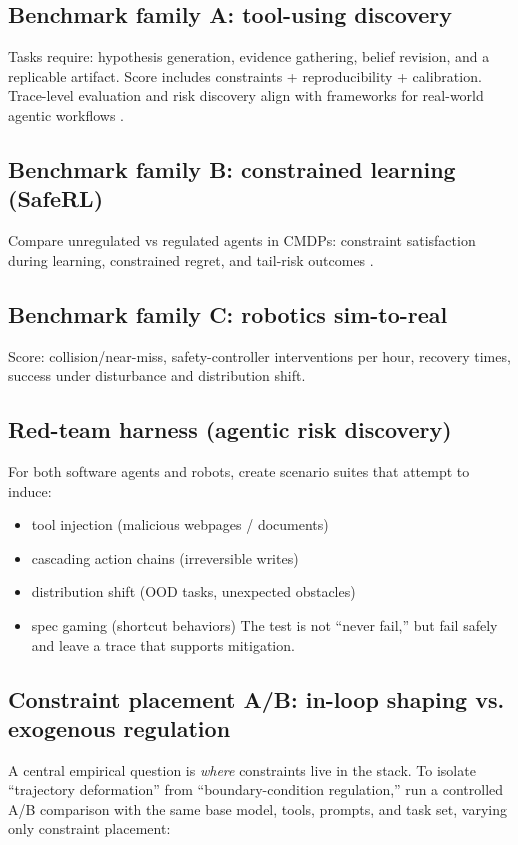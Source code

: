 \documentclass[11pt]{article}
\begin{document}
\subsection{Benchmark family A: tool-using discovery}
Tasks require: hypothesis generation, evidence gathering, belief revision, and a replicable artifact.
Score includes constraints + reproducibility + calibration. Trace-level evaluation and risk discovery
align with frameworks for real-world agentic workflows \citep{ghosh2025agentic}.
\subsection{Benchmark family B: constrained learning (SafeRL)}
Compare unregulated vs regulated agents in CMDPs: constraint satisfaction during learning,
constrained regret, and tail-risk outcomes \citep{kushwaha2025saferl_cmdp_survey,ni2025safe_exploration_cmdp}.
\subsection{Benchmark family C: robotics sim-to-real}
Score: collision/near-miss, safety-controller interventions per hour, recovery times, success under
disturbance and distribution shift.
\subsection{Red-team harness (agentic risk discovery)}
For both software agents and robots, create scenario suites that attempt to induce:
\begin{itemize}
\item 
tool injection (malicious webpages / documents)
\item 
cascading action chains (irreversible writes)
\item 
distribution shift (OOD tasks, unexpected obstacles)
\item 
spec gaming (shortcut behaviors)
The test is not “never fail,” but fail safely and leave a trace that supports mitigation.
\end{itemize}
\subsection{Constraint placement A/B: in-loop shaping vs. exogenous regulation}
A central empirical question is \emph{where} constraints live in the stack. To isolate ``trajectory deformation''
from ``boundary-condition regulation,'' run a controlled A/B comparison with the same base model, tools, prompts,
and task set, varying only constraint placement:
\end{document}
